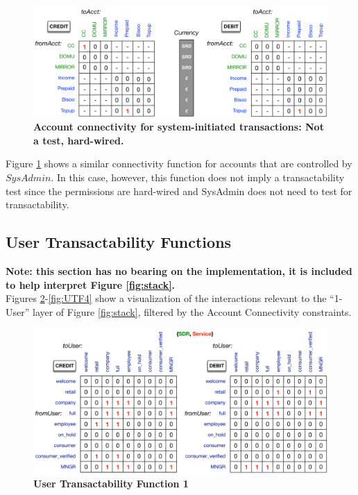 \begin{figure}[H]
\vspace{-0.5cm}
\centering
\includegraphics[width=15cm]{Figures/SysAdmin_Acct_Connectivity}
\caption{\small\textbf{Account connectivity for system-initiated transactions: Not a test, hard-wired. }}
\label{fig:SysAdmin_Acct_Connectivity}
\vspace{-1cm}
\end{figure}

Figure \ref{fig:SysAdmin_Acct_Connectivity} shows a similar connectivity function for accounts that are controlled by $SysAdmin$. In this case, however, this function does not imply a transactability test since the permissions are hard-wired and SysAdmin does not need to test for transactability.

\subsection{User Transactability Functions}
\textbf{\small Note: this section has no bearing on the implementation, it is included to help interpret Figure \ref{fig:stack}.}\\ Figures \ref{fig:UTF1}-\ref{fig:UTF4} show a visualization of the interactions relevant to the ``1-User'' layer of Figure \ref{fig:stack}, filtered by the Account Connectivity constraints.

\begin{figure}[H]
\vspace{-0.5cm}
\centering
\includegraphics[width=16cm]{Figures/UTF1}
\caption{\small\textbf{User Transactability Function 1}}
\label{fig:UTF1}
\end{figure}

